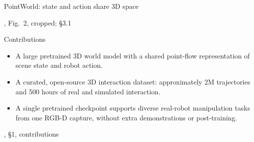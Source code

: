 \documentclass[aspectratio=169,12pt]{beamer}
\newcommand{\credit}[1]{\par\hfill{\tiny\color{mute}\citet{huang2026pointworld}, #1}\par}
\newcommand{\pw}[1]{{\color{pw}#1}}
\begin{document}
\begin{frame}[t]{PointWorld: state and action share 3D space}

\credit{Fig.~2, cropped; \S3.1}
\end{frame}

\begin{frame}{Contributions}
  \vfill
  \begin{itemize}\setlength{\itemsep}{16pt}
    \item<1-> A large pretrained \pw{3D world model} with a shared point-flow representation of scene state and robot action.
    \item<2-> A curated, open-source 3D interaction dataset: approximately \pw{2M trajectories and 500 hours} of real and simulated interaction.
    \item<3-> A \pw{single pretrained checkpoint} supports diverse real-robot manipulation tasks from one RGB-D capture, without extra demonstrations or post-training.
  \end{itemize}
  \vfill
  \credit{\S1, contributions}
\end{frame}
\end{document}
